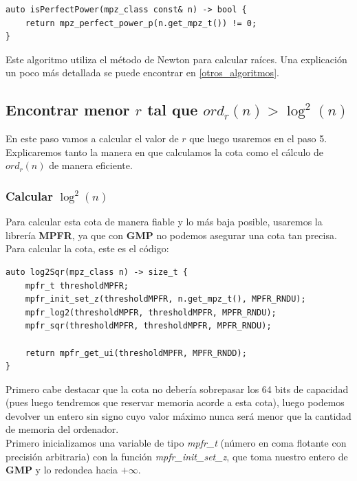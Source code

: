 \begin{lstlisting}
auto isPerfectPower(mpz_class const& n) -> bool {
	return mpz_perfect_power_p(n.get_mpz_t()) != 0;
}
\end{lstlisting}

Este algoritmo utiliza el método de Newton para calcular raíces. Una explicación un poco más detallada se puede encontrar en \autoref{otros_algoritmos}.

\subsection{Encontrar menor $r$ tal que $ord_r(n) > \log^2(n)$}

En este paso vamos a calcular el valor de $r$ que luego usaremos en el paso 5. Explicaremos tanto la manera en que calculamos la cota como el cálculo de $ord_r(n)$ de manera eficiente.

\subsubsection{Calcular $\log^2(n)$}

Para calcular esta cota de manera fiable y lo más baja posible, usaremos la librería \textbf{MPFR}, ya que con \textbf{GMP} no podemos asegurar una cota tan precisa. Para calcular la cota, este es el código:\\

\begin{lstlisting}
auto log2Sqr(mpz_class n) -> size_t {
	mpfr_t thresholdMPFR;
	mpfr_init_set_z(thresholdMPFR, n.get_mpz_t(), MPFR_RNDU);
	mpfr_log2(thresholdMPFR, thresholdMPFR, MPFR_RNDU);
	mpfr_sqr(thresholdMPFR, thresholdMPFR, MPFR_RNDU);
	
	return mpfr_get_ui(thresholdMPFR, MPFR_RNDD);
}
\end{lstlisting}

Primero cabe destacar que la cota no debería sobrepasar los 64 bits de capacidad (pues luego tendremos que reservar memoria acorde a esta cota), luego podemos devolver un entero sin signo cuyo valor máximo nunca será menor que la cantidad de memoria del ordenador.\\

Primero inicializamos una variable de tipo \textit{mpfr\_t} (número en coma flotante con precisión arbitraria) con la función \textit{mpfr\_init\_set\_z}, que toma nuestro entero de \textbf{GMP} y lo redondea hacia $+\infty$.\\

